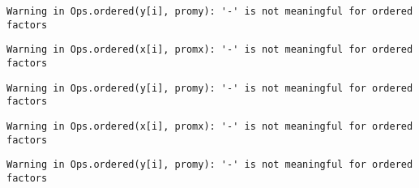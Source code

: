 \documentclass[]{article}
\begin{document}
\begin{verbatim}
Warning in Ops.ordered(y[i], promy): '-' is not meaningful for ordered
factors
\end{verbatim}

\begin{verbatim}
Warning in Ops.ordered(x[i], promx): '-' is not meaningful for ordered
factors
\end{verbatim}

\begin{verbatim}
Warning in Ops.ordered(y[i], promy): '-' is not meaningful for ordered
factors
\end{verbatim}

\begin{verbatim}
Warning in Ops.ordered(x[i], promx): '-' is not meaningful for ordered
factors
\end{verbatim}

\begin{verbatim}
Warning in Ops.ordered(y[i], promy): '-' is not meaningful for ordered
factors
\end{verbatim}
\end{document}
